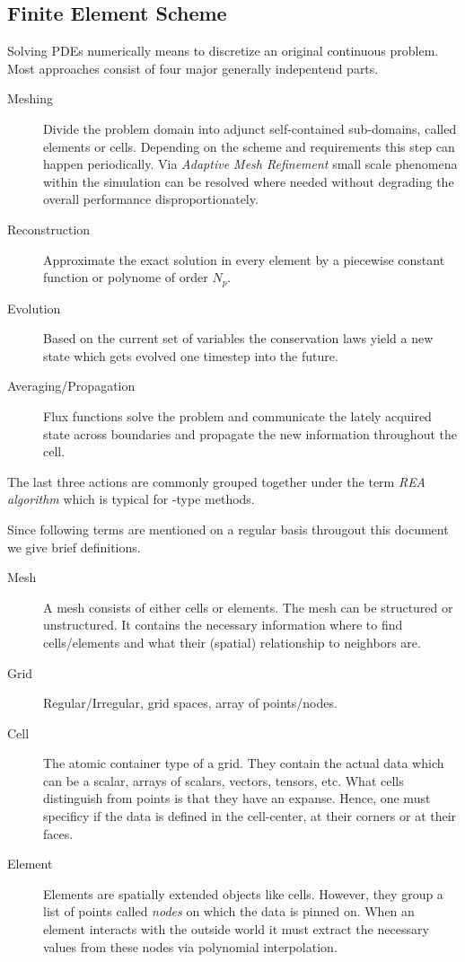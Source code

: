 \subsection{Finite Element Scheme}

Solving PDEs numerically means to discretize an original continuous problem.
Most approaches consist of four major generally indepentend parts.

\begin{description}
\item [Meshing] Divide the problem domain into adjunct self-contained
sub-domains, called elements or cells. Depending on the scheme and requirements
this step can happen periodically. Via \emph{Adaptive Mesh Refinement} small
scale phenomena within the simulation can be resolved where needed without
degrading the overall performance disproportionately.

\item [Reconstruction] Approximate the exact solution in every element by a
piecewise constant function or polynome of order $N_p$.

\item [Evolution] Based on the current set of variables the conservation
laws yield a new state which gets evolved one timestep into the future.

\item [Averaging/Propagation] Flux functions solve the  problem
and communicate the lately acquired state across boundaries and propagate the
new information throughout the cell.  \end{description}

The last three actions are commonly grouped together under the term \emph{REA
algorithm} which is typical for -type methods.

Since following terms are mentioned on a regular basis througout this document
we give brief definitions.
\begin{description}
\item[Mesh] A mesh consists of either cells or elements. The mesh can be
structured or unstructured. It contains the necessary information where to find
cells/elements and what their (spatial) relationship to neighbors are.

\item[Grid] Regular/Irregular, grid spaces, array of points/nodes.

\item[Cell] The atomic container type of a grid. They contain the actual data
which can be a scalar, arrays of scalars, vectors, tensors, etc. What cells
distinguish from points is that they have an expanse. Hence, one must specificy
if the data is defined in the cell-center, at their corners or at their faces.

\item[Element] Elements are spatially extended objects like cells. However,
they group a list of points called \emph{nodes} on which the data is pinned on.
When an element interacts with the outside world it must extract the necessary
values from these nodes via polynomial interpolation.
\end{description}
